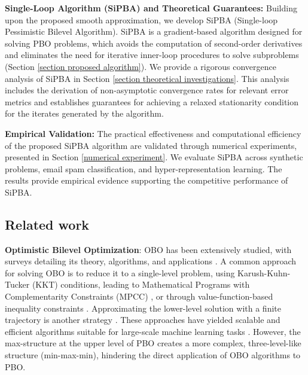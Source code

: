 \documentclass{article}
\begin{document}
\textbf{Single-Loop Algorithm (SiPBA) and Theoretical Guarantees:}
Building upon the proposed smooth approximation, we develop SiPBA (Single-loop Pessimistic Bilevel Algorithm). SiPBA is a gradient-based algorithm designed for solving PBO problems, which avoids the computation of second-order derivatives and eliminates the need for iterative inner-loop procedures to solve subproblems (Section \ref{section proposed algorithm}).
We provide a rigorous convergence analysis of SiPBA in Section \ref{section theoretical investigations}. This analysis includes the derivation of non-asymptotic convergence rates for relevant error metrics and establishes guarantees for achieving a relaxed stationarity condition for the iterates generated by the algorithm.


\textbf{Empirical Validation:}
The practical effectiveness and computational efficiency of the proposed SiPBA algorithm are validated through numerical experiments, presented in Section \ref{numerical experiment}. We evaluate SiPBA across synthetic problems, email spam classification, and hyper-representation learning. The results provide empirical evidence supporting the competitive performance of SiPBA.

\subsection{Related work}



\textbf{Optimistic Bilevel Optimization}: 
OBO has been extensively studied, with surveys detailing its theory, algorithms, and applications \cite{colson2007overview, dempe2013bilevel, dempe2020bilevel}. A common approach for solving OBO is to reduce it to a single-level problem, using Karush-Kuhn-Tucker (KKT) conditions, leading to Mathematical Programs with Complementarity Constraints (MPCC) \cite{allende2013solving, luo1996mathematical}, or through value-function-based inequality constraints \cite{ye1995optimality, outrata1990numerical}. Approximating the lower-level solution with a finite trajectory is another strategy \cite{maclaurin2015gradient,pmlr-v70-franceschi17a}. These approaches have yielded scalable and efficient algorithms suitable for large-scale machine learning tasks 
\cite{pedregosa2016hyperparameter, franceschi2018bilevel, lorraine2020optimizing, liu2020generic,liu2021towards,sow2022convergence, hong2023two,arbel2021amortized, lu2023slm,ji2021bilevel,shen2023penalty, kwon2023fully, liu2022bome, lu2024first, kwon2023penalty}. However, the max-structure at the upper level of PBO creates a more complex, three-level-like structure (min-max-min), hindering the direct application of OBO algorithms to PBO.
\end{document}
